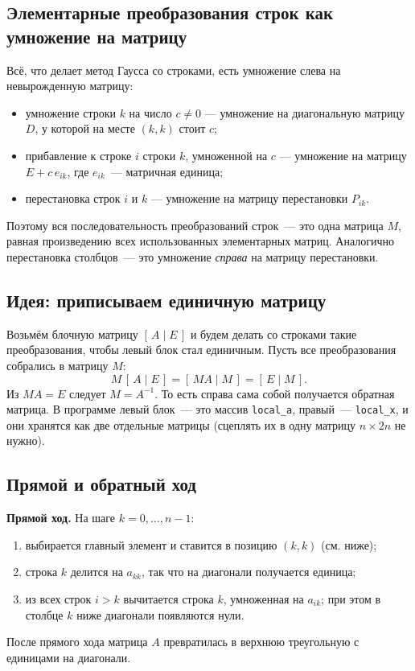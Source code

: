 \documentclass[11pt,a4paper]{report}
\begin{document}
\subsection{Элементарные преобразования строк как умножение на матрицу}

Всё, что делает метод Гаусса со строками, есть умножение слева на невырожденную
матрицу:
\begin{itemize}[nosep]
\item умножение строки $k$ на число $c\neq 0$ --- умножение на диагональную
      матрицу $D$, у которой на месте $(k,k)$ стоит $c$;
\item прибавление к строке $i$ строки $k$, умноженной на $c$ --- умножение на
      матрицу $E+c\,e_{ik}$, где $e_{ik}$~--- матричная единица;
\item перестановка строк $i$ и $k$ --- умножение на матрицу перестановки $P_{ik}$.
\end{itemize}
Поэтому вся последовательность преобразований строк~--- это одна матрица $M$,
равная произведению всех использованных элементарных матриц. Аналогично
перестановка столбцов~--- это умножение \emph{справа} на матрицу перестановки.

\subsection{Идея: приписываем единичную матрицу}

Возьмём блочную матрицу $[\,A \mid E\,]$ и будем делать со строками такие
преобразования, чтобы левый блок стал единичным. Пусть все преобразования
собрались в матрицу $M$:
\[
M\,[\,A \mid E\,] = [\,MA \mid M\,] = [\,E \mid M\,].
\]
Из $MA=E$ следует $M=A^{-1}$. То есть справа сама собой получается обратная
матрица. В программе левый блок~--- это массив \texttt{local\_a}, правый~---
\texttt{local\_x}, и они хранятся как две отдельные матрицы (сцеплять их в одну
матрицу $n\times 2n$ не нужно).

\subsection{Прямой и обратный ход}

\textbf{Прямой ход.} На шаге $k=0,\dots,n-1$:
\begin{enumerate}[nosep]
\item выбирается главный элемент и ставится в позицию $(k,k)$ (см. ниже);
\item строка $k$ делится на $a_{kk}$, так что на диагонали получается единица;
\item из всех строк $i>k$ вычитается строка $k$, умноженная на $a_{ik}$;
      при этом в столбце $k$ ниже диагонали появляются нули.
\end{enumerate}
После прямого хода матрица $A$ превратилась в верхнюю треугольную с единицами на
диагонали.
\end{document}
